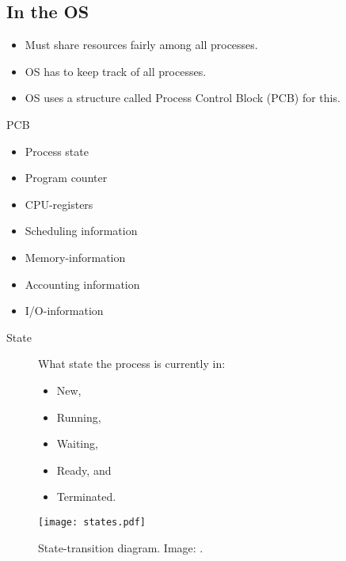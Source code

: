 \documentclass{beamer}
\begin{document}
\subsection{In the OS}

\begin{frame}{\insertsubsectionhead}
  \begin{itemize}
    \item Must share resources fairly among all processes.
    \item OS has to keep track of all processes.
    \item OS uses a structure called Process Control Block (PCB) for this.
  \end{itemize}
\end{frame}

\begin{frame}{\insertsubsectionhead}{PCB}
  \begin{itemize}
    \item Process state
    \item Program counter
    \item CPU-registers
    \item Scheduling information
    \item Memory-information
    \item Accounting information
    \item I/O-information
  \end{itemize}
\end{frame}

\begin{frame}{\insertsubsectionhead}
  \begin{description}
    \item[State] What state the process is currently in:
      \begin{itemize}
        \item New,
        \item Running,
        \item Waiting,
        \item Ready, and
        \item Terminated.
      \end{itemize}
  \end{description}
\end{frame}

\begin{frame}{\insertsubsectionhead}
  \begin{figure}
    \texttt{[image: states.pdf]}
    \caption{State-transition diagram.
      Image: \cite[p.\ 103]{Silberschatz2009osc}.}
  \end{figure}
\end{frame}
\end{document}
